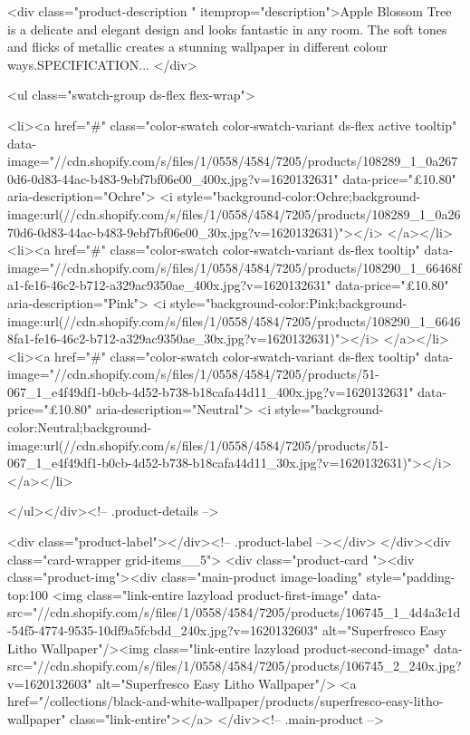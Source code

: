 {{{{{{{<div class="product-description " itemprop="description">Apple Blossom Tree is a delicate and elegant design and looks fantastic in any room. The soft tones and flicks of metallic creates a stunning wallpaper in different colour ways.SPECIFICATION...
</div>



<ul class="swatch-group ds-flex flex-wrap">
        
<li><a href="#" class="color-swatch color-swatch-variant ds-flex active tooltip" data-image="//cdn.shopify.com/s/files/1/0558/4584/7205/products/108289_1_0a2670d6-0d83-44ac-b483-9ebf7bf06e00_400x.jpg?v=1620132631" data-price="£10.80" aria-description="Ochre">
              <i style="background-color:Ochre;background-image:url(//cdn.shopify.com/s/files/1/0558/4584/7205/products/108289_1_0a2670d6-0d83-44ac-b483-9ebf7bf06e00_30x.jpg?v=1620132631)"></i>
            </a></li>
<li><a href="#" class="color-swatch color-swatch-variant ds-flex tooltip" data-image="//cdn.shopify.com/s/files/1/0558/4584/7205/products/108290_1_66468fa1-fe16-46c2-b712-a329ac9350ae_400x.jpg?v=1620132631" data-price="£10.80" aria-description="Pink">
              <i style="background-color:Pink;background-image:url(//cdn.shopify.com/s/files/1/0558/4584/7205/products/108290_1_66468fa1-fe16-46c2-b712-a329ac9350ae_30x.jpg?v=1620132631)"></i>
            </a></li>
<li><a href="#" class="color-swatch color-swatch-variant ds-flex tooltip" data-image="//cdn.shopify.com/s/files/1/0558/4584/7205/products/51-067_1_e4f49df1-b0cb-4d52-b738-b18cafa44d11_400x.jpg?v=1620132631" data-price="£10.80" aria-description="Neutral">
              <i style="background-color:Neutral;background-image:url(//cdn.shopify.com/s/files/1/0558/4584/7205/products/51-067_1_e4f49df1-b0cb-4d52-b738-b18cafa44d11_30x.jpg?v=1620132631)"></i>
            </a></li>

      </ul></div><!-- .product-details -->

<div class="product-label"></div><!-- .product-label --></div>
          </div><div class="card-wrapper grid-items__5">
            <div class="product-card "><div class="product-img"><div class="main-product image-loading" style="padding-top:100%
      <img class="link-entire lazyload product-first-image" data-src="//cdn.shopify.com/s/files/1/0558/4584/7205/products/106745_1_4d4a3c1d-54f5-4774-9535-10df9a5fcbdd_240x.jpg?v=1620132603" alt="Superfresco Easy Litho Wallpaper"/><img class="link-entire lazyload product-second-image" data-src="//cdn.shopify.com/s/files/1/0558/4584/7205/products/106745_2_240x.jpg?v=1620132603" alt="Superfresco Easy Litho Wallpaper"/>
      <a href="/collections/black-and-white-wallpaper/products/superfresco-easy-litho-wallpaper" class="link-entire"></a>
    </div><!-- .main-product -->
  
}}}}}}}
